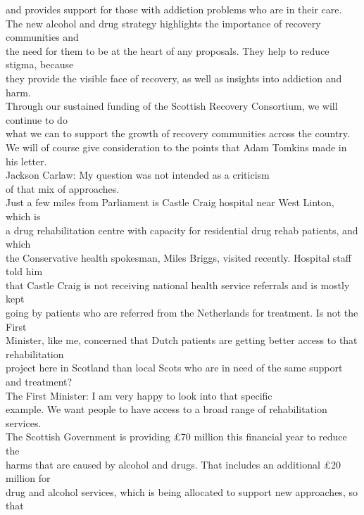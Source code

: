 \documentclass{article}
\begin{document}
\begin{description}
{and provides support for those with addiction problems who are in their care.\\
The new alcohol and drug strategy highlights the importance of recovery communities and\\
the need for them to be at the heart of any proposals. They help to reduce stigma, because\\
they provide the visible face of recovery, as well as insights into addiction and harm.\\
Through our sustained funding of the Scottish Recovery Consortium, we will continue to do\\
what we can to support the growth of recovery communities across the country.\\
We will of course give consideration to the points that Adam Tomkins made in his letter.\\
Jackson Carlaw: My question was not intended as a criticism\\
of that mix of approaches.\\
Just a few miles from Parliament is Castle Craig hospital near West Linton, which is\\
a drug rehabilitation centre with capacity for residential drug rehab patients, and which\\
the Conservative health spokesman, Miles Briggs, visited recently. Hospital staff told him\\
that Castle Craig is not receiving national health service referrals and is mostly kept\\
going by patients who are referred from the Netherlands for treatment. Is not the First\\
Minister, like me, concerned that Dutch patients are getting better access to that rehabilitation\\
project here in Scotland than local Scots who are in need of the same support and treatment?\\
The First Minister: I am very happy to look into that specific\\
example. We want people to have access to a broad range of rehabilitation services.\\
The Scottish Government is providing £70 million this financial year to reduce the\\
harms that are caused by alcohol and drugs. That includes an additional £20 million for\\
drug and alcohol services, which is being allocated to support new approaches, so that\\
}
\end{description}
\end{document}
